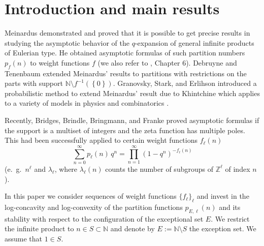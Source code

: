 \documentclass[12pt]{amsart}
\theoremstyle{definition}
\theoremstyle{remark}
\numberwithin{theorem}{section} \numberwithin{equation}{section}
\begin{document}
\maketitle
\newpage

\section{Introduction and
main
results}

Meinardus \cite{Me54} demonstrated and proved that it is possible to
get precise results in studying the asymptotic behavior of the
$q$-expansion of general infinite products of Eulerian type.
He obtained asymptotic formulas of such partition numbers $p_f(n)$ to weight functions $f$
(we also refer to \cite{An98}, Chapter 6). 
Debruyne and Tenenbaum \cite{DT20}
extended Meinardus' results to partitions with restrictions on the parts
with support $\mathbb{N} \setminus
f^{-1}\left( \left\{ 0\right\} \right) $. Granovsky, Stark, and Erlihson
introduced a probabilistic method to extend Meinardus' result due to Khintchine
which applies to a variety of models in physics and combinatorics 
\cite{GSE08, GS06,GS12, GS15}.

Recently, Bridges, Brindle, Bringmann, and Franke \cite{BBBF24} proved asymptotic formulas if the support is a multiset of integers and the zeta function has multiple poles. 
This had been successfully applied \cite{BFH24} to certain weight functions $f_{\ell}(n)$ 
\begin{equation*}\label{weights}
\sum_{n=0}^{\infty} p_{\ell}(n) \, q^n = \prod_{n=1
}^{\infty} \left( 1 - q^n \right)^{-f_{\ell}(n)}
\end{equation*}
(e.~g.\
$n^{\ell}$ and
$\lambda_{\ell}$, where $\lambda_{\ell}(n)$ counts the number of subgroups of $\mathbb{Z}^{\ell}$ of index $n$).

In this paper we 
consider sequences of weight functions $\{f_{\ell}\}_{\ell}$
and invest in the log-concavity and log-convexity 
of the partition functions $p_{E,
{\ell }}\left( n\right) $ and its 
stability with respect to the configuration of the exceptional set $E$.
We restrict the infinite product to $n \in S \subset \mathbb{N}$ and
denote by
$E:= \mathbb{N} \setminus S $ the exception set.
We assume that $1 \in S$. 
\end{document}

